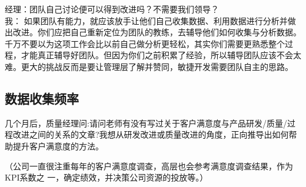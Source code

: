 经理：团队自己讨论便可以得到改进吗？不需要我们领导？\\
我：
如果团队有能力，就应该放手让他们自己收集数据、利用数据进行分析并做出改进。你们应把自己重新定位为团队的教练，去辅导他们如何收集与分析数据。千万不要以为这项工作会比以前自己做分析更轻松，其实你们需要更熟悉整个过程，才能真正辅导好团队。但因为你们之前积累了经验，所以辅导团队应该不会太难。更大的挑战反而是要让管理层了解并赞同，敏捷开发需要团队自主的思路。

\hypertarget{ux6570ux636eux6536ux96c6ux9891ux7387}{%
\subsection{数据收集频率}\label{ux6570ux636eux6536ux96c6ux9891ux7387}}

几个月后，质量经理问:请问老师有没有写过关于客户满意度与产品研发/质量/过程改进之间的关系的文章?我想从研发改进或质量改进的角度，正向推导出如何帮助提升客户满意度的方法。

\begin{description}
\tightlist
\item[]
（公司一直很注重每年的客户满意度调查，高层也会参考满意度调查结果，作为
KPI系数之 一，确定绩效，并决策公司资源的投放等。）\\
\end{description}

